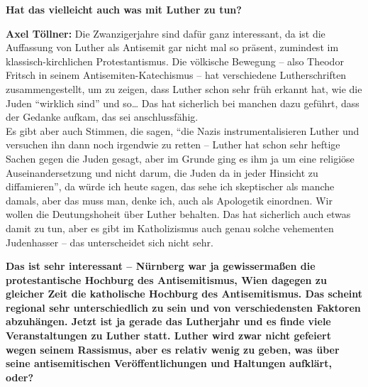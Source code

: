 \textbf{Hat das vielleicht auch was mit Luther zu tun?} 

\textbf{Axel Töllner:} Die Zwanzigerjahre sind dafür ganz interessant, da ist die Auffassung von Luther als Antisemit gar nicht mal so präsent, zumindest im klassisch-kirchlichen Protestantismus.  
Die völkische Bewegung – also Theodor Fritsch in seinem Antisemiten-Katechismus – hat verschiedene Lutherschriften zusammengestellt, um zu zeigen, dass Luther schon sehr früh erkannt hat, wie die Juden "`wirklich sind"' und so… Das hat sicherlich bei manchen dazu geführt, dass der Gedanke aufkam, das sei anschlussfähig. \\
Es gibt aber auch Stimmen, die sagen, "`die Nazis instrumentalisieren Luther und versuchen ihn dann noch irgendwie zu retten – Luther hat schon sehr heftige Sachen gegen die Juden gesagt, aber im Grunde ging es ihm ja um eine religiöse Auseinandersetzung und nicht darum, die Juden da in jeder Hinsicht zu diffamieren"', da würde ich heute sagen, das sehe ich skeptischer als manche damals, aber das muss man, denke ich, auch als Apologetik einordnen. Wir wollen die Deutungshoheit über Luther behalten. Das hat sicherlich auch etwas damit zu tun, aber es gibt im Katholizismus auch genau solche vehementen Judenhasser – das unterscheidet sich nicht sehr. 

\textbf{Das ist sehr interessant – Nürnberg war ja gewissermaßen die protestantische Hochburg des Antisemitismus, Wien dagegen zu gleicher Zeit die katholische Hochburg des Antisemitismus. Das scheint regional sehr unterschiedlich zu sein und von verschiedensten Faktoren abzuhängen. 
Jetzt ist ja gerade das Lutherjahr und es finde viele Veranstaltungen zu Luther statt. Luther wird zwar nicht gefeiert wegen seinem Rassismus, aber es relativ wenig zu geben, was über seine antisemitischen Veröffentlichungen und Haltungen aufklärt, oder?} 

